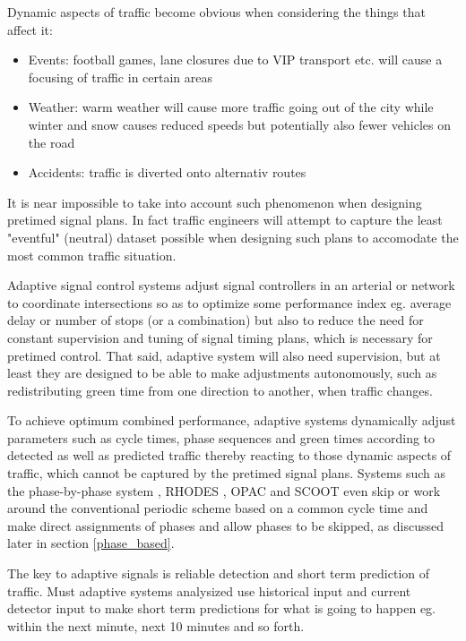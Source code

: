 Dynamic aspects of traffic become obvious when considering the things that affect it:

\begin{itemize}
\item Events: football games, lane closures due to VIP transport etc. will cause a focusing of traffic in certain areas
\item Weather: warm weather will cause more traffic going out of the city while winter and snow causes reduced speeds but potentially also fewer vehicles on the road
\item Accidents: traffic is diverted onto alternativ routes
\end{itemize}

It is near impossible to take into account such phenomenon when designing pretimed signal plans. In fact traffic engineers will attempt to capture the least "eventful" (neutral) dataset possible when designing such plans to accomodate the most common traffic situation.

Adaptive signal control systems adjust signal controllers in an arterial or network to coordinate intersections so as to optimize some performance index eg. average delay or number of stops (or a combination) but also to reduce the need for constant supervision and tuning of signal timing plans, which is necessary for pretimed control. That said, adaptive system will also need supervision, but at least they are designed to be able to make adjustments autonomously, such as redistributing green time from one direction to another, when traffic changes.

To achieve optimum combined performance, adaptive systems dynamically adjust parameters such as cycle times, phase sequences and green times according to detected as well as predicted traffic thereby reacting to those dynamic aspects of traffic, which cannot be captured by the pretimed signal plans. Systems such as the phase-by-phase system \cite{phase_by_phase}, RHODES \cite{rhodes}, OPAC \cite{opac} and SCOOT \cite{scoot} even skip or work around the conventional periodic scheme based on a common cycle time and make direct assignments of phases and allow phases to be skipped, as discussed later in section \ref{phase_based}. 

The key to adaptive signals is reliable detection and short term prediction of traffic. Must adaptive systems analysized use historical input and current detector input to make short term predictions for what is going to happen eg. within the next minute, next 10 minutes and so forth.

